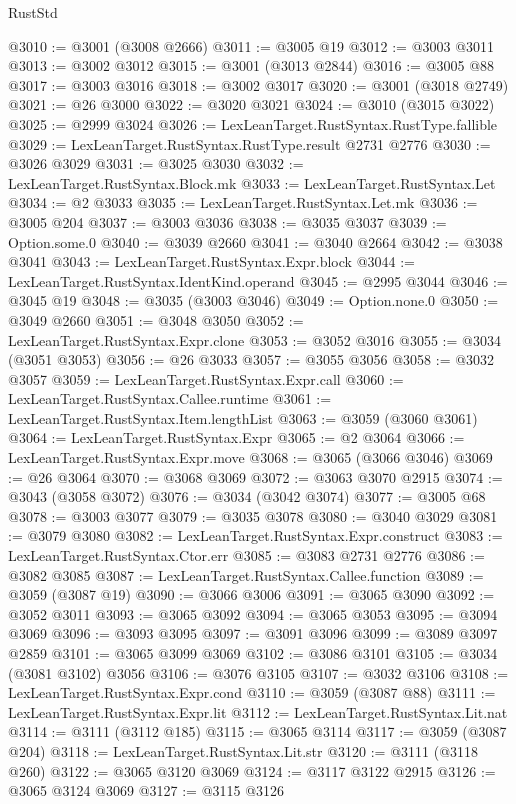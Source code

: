 \begin{lexlean}{RustStd}
\begin{coremodule}
@3010 := @3001 (@3008 @2666)
@3011 := @3005 @19
@3012 := @3003 @3011
@3013 := @3002 @3012
@3015 := @3001 (@3013 @2844)
@3016 := @3005 @88
@3017 := @3003 @3016
@3018 := @3002 @3017
@3020 := @3001 (@3018 @2749)
@3021 := @26 @3000
@3022 := @3020 @3021
@3024 := @3010 (@3015 @3022)
@3025 := @2999 @3024
@3026 := LexLeanTarget.RustSyntax.RustType.fallible
@3029 := LexLeanTarget.RustSyntax.RustType.result @2731 @2776
@3030 := @3026 @3029
@3031 := @3025 @3030
@3032 := LexLeanTarget.RustSyntax.Block.mk
@3033 := LexLeanTarget.RustSyntax.Let
@3034 := @2 @3033
@3035 := LexLeanTarget.RustSyntax.Let.mk
@3036 := @3005 @204
@3037 := @3003 @3036
@3038 := @3035 @3037
@3039 := Option.some.{0}
@3040 := @3039 @2660
@3041 := @3040 @2664
@3042 := @3038 @3041
@3043 := LexLeanTarget.RustSyntax.Expr.block
@3044 := LexLeanTarget.RustSyntax.IdentKind.operand
@3045 := @2995 @3044
@3046 := @3045 @19
@3048 := @3035 (@3003 @3046)
@3049 := Option.none.{0}
@3050 := @3049 @2660
@3051 := @3048 @3050
@3052 := LexLeanTarget.RustSyntax.Expr.clone
@3053 := @3052 @3016
@3055 := @3034 (@3051 @3053)
@3056 := @26 @3033
@3057 := @3055 @3056
@3058 := @3032 @3057
@3059 := LexLeanTarget.RustSyntax.Expr.call
@3060 := LexLeanTarget.RustSyntax.Callee.runtime
@3061 := LexLeanTarget.RustSyntax.Item.lengthList
@3063 := @3059 (@3060 @3061)
@3064 := LexLeanTarget.RustSyntax.Expr
@3065 := @2 @3064
@3066 := LexLeanTarget.RustSyntax.Expr.move
@3068 := @3065 (@3066 @3046)
@3069 := @26 @3064
@3070 := @3068 @3069
@3072 := @3063 @3070 @2915
@3074 := @3043 (@3058 @3072)
@3076 := @3034 (@3042 @3074)
@3077 := @3005 @68
@3078 := @3003 @3077
@3079 := @3035 @3078
@3080 := @3040 @3029
@3081 := @3079 @3080
@3082 := LexLeanTarget.RustSyntax.Expr.construct
@3083 := LexLeanTarget.RustSyntax.Ctor.err
@3085 := @3083 @2731 @2776
@3086 := @3082 @3085
@3087 := LexLeanTarget.RustSyntax.Callee.function
@3089 := @3059 (@3087 @19)
@3090 := @3066 @3006
@3091 := @3065 @3090
@3092 := @3052 @3011
@3093 := @3065 @3092
@3094 := @3065 @3053
@3095 := @3094 @3069
@3096 := @3093 @3095
@3097 := @3091 @3096
@3099 := @3089 @3097 @2859
@3101 := @3065 @3099 @3069
@3102 := @3086 @3101
@3105 := @3034 (@3081 @3102) @3056
@3106 := @3076 @3105
@3107 := @3032 @3106
@3108 := LexLeanTarget.RustSyntax.Expr.cond
@3110 := @3059 (@3087 @88)
@3111 := LexLeanTarget.RustSyntax.Expr.lit
@3112 := LexLeanTarget.RustSyntax.Lit.nat
@3114 := @3111 (@3112 @185)
@3115 := @3065 @3114
@3117 := @3059 (@3087 @204)
@3118 := LexLeanTarget.RustSyntax.Lit.str
@3120 := @3111 (@3118 @260)
@3122 := @3065 @3120 @3069
@3124 := @3117 @3122 @2915
@3126 := @3065 @3124 @3069
@3127 := @3115 @3126

\end{coremodule}
\end{lexlean}
